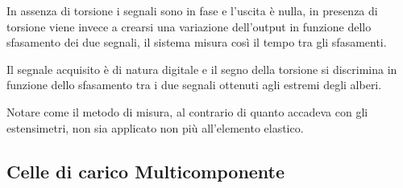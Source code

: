 \documentclass[a4paper, 15pt]{article}
\begin{document}
\begin{adjustwidth}{2in}{}
  		In assenza di torsione i segnali sono in fase e l'uscita è nulla, in presenza di torsione viene invece a crearsi una variazione dell'output in funzione dello sfasamento dei due segnali, il sistema misura così il tempo tra gli sfasamenti. 
  		
  		Il segnale acquisito è di natura digitale e il segno della torsione si discrimina in funzione dello sfasamento tra i due segnali ottenuti agli estremi degli alberi. \newline 
  		
  		Notare come il metodo di misura, al contrario di quanto accadeva con gli estensimetri, non sia applicato non più all'elemento elastico.  
\end{adjustwidth}
\subsection{Celle di carico Multicomponente}		
\end{document}
